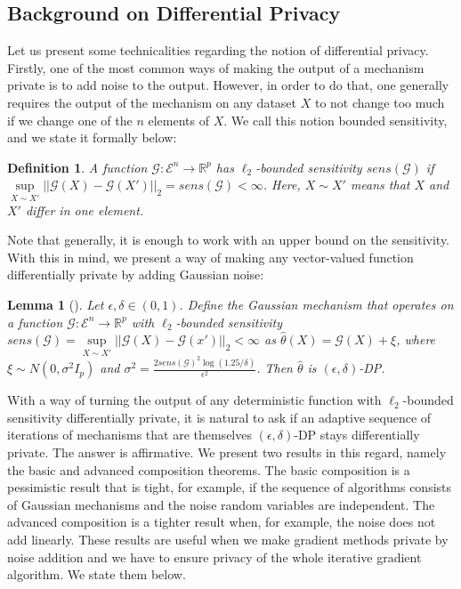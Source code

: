 \documentclass{article}
\newtheorem{lemma}{Lemma}
\newtheorem{definition}{Definition}[section]
\begin{document}
\subsection{Background on Differential Privacy}\label{sec:Appendix_DP_Prelim}

Let us present some technicalities regarding the notion of differential privacy. Firstly, one of the most common ways of making the output of a mechanism private is to add noise to the output. However, in order to do that, one generally requires the output of the mechanism on any dataset $X$ to not change too much if we change one of the $n$ elements of $X$. We call this notion bounded sensitivity, and we state it formally below:
\begin{definition}
A function $\mathcal{G} : \mathcal{E}^n \rightarrow \mathbb{R}^p$ has $\ell_2$-bounded sensitivity $sens(\mathcal{G})$ if $\mathop{\sup}\limits_{X \sim X'}||\mathcal{G}(X) - \mathcal{G}(X')||_2 = sens(\mathcal{G}) < \infty$. Here, $X \sim X'$ means that $X$ and $X'$ differ in one element.
\end{definition}

Note that generally, it is enough to work with an upper bound on the sensitivity. With this in mind, we present a way of making any vector-valued function differentially private by adding Gaussian noise:

\begin{lemma}[\cite{IMPROVE_DP}]
\label{lemma:mGDP}
Let $\epsilon, \delta \in (0, 1)$. Define the Gaussian mechanism that operates on a function $\mathcal{G} : \mathcal{E}^n \rightarrow \mathbb{R}^p$ with $\ell_2$-bounded sensitivity $sens(\mathcal{G}) = \mathop{\sup}\limits_{X \sim X'}||\mathcal{G}(X) - \mathcal{G}(x')||_2 < \infty$ as $\widehat{\theta}(X) = \mathcal{G}(X) + \xi$, where $\xi \sim N(0, \sigma^2I_p)$ and $\sigma^2 = \frac{2 sens(\mathcal{G})^2\log(1.25/\delta)}{\epsilon^2}$. Then $\widehat{\theta}$ is $(\epsilon, \delta)$-DP.
\end{lemma}

With a way of turning the output of any deterministic function with $\ell_2$-bounded sensitivity differentially private, it is natural to ask if an adaptive sequence of iterations of mechanisms that are themselves $(\epsilon, \delta)$-DP stays differentially private. The answer is affirmative. We present two results in this regard, namely the basic and advanced composition theorems. The basic composition is a pessimistic result that is tight, for example, if the sequence of algorithms consists of Gaussian mechanisms and the noise random variables are independent. The advanced composition is a tighter result when, for example, the noise does not add linearly. These results are useful when we make gradient methods private by noise addition and we have to ensure privacy of the whole iterative gradient algorithm. We state them below.
\end{document}
